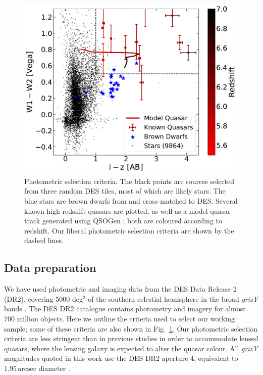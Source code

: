 \documentclass[fleqn,usenatbib]{mnras}
\begin{document}
\begin{figure}
\includegraphics[width=\columnwidth]{figs/selection_criteria.pdf}
\vspace{-.4cm}
\caption{Photometric selection criteria.
The black points are sources selected from three random DES tiles, most of which are likely stars.
The blue stars are brown dwarfs from \citet{kirkpatrick11} and \citet{best15} cross-matched to DES.
Several known high-redshift quasars are plotted, as well as a model quasar track generated using QSOGen \citep{temple22}; both are coloured according to redshift.
Our liberal photometric selection criteria are shown by the dashed lines.
}
\label{fig:colours}
\end{figure}

\subsection{Data preparation} \label{dataprep}

We have used photometric and imaging data from the DES Data Release 2 (DR2), covering 5000 deg$^2$ of the southern celestial hemisphere in the broad \textit{grizY} bands \citep{desdr2}.
The DES DR2 catalogue contains photometry and imagery for almost 700 million objects.
Here we outline the criteria used to select our working sample;
some of these criteria are also shown in Fig.~\ref{fig:colours}.
Our photometric selection criteria are less stringent than in previous studies in order to accommodate lensed quasars, where the lensing galaxy is expected to alter the quasar colour.
All \textit{grizY} magnitudes quoted in this work use the DES DR2 aperture 4, equivalent to $1.95\,\text{arcsec}$ diameter \citep{desdr2}.
\end{document}
